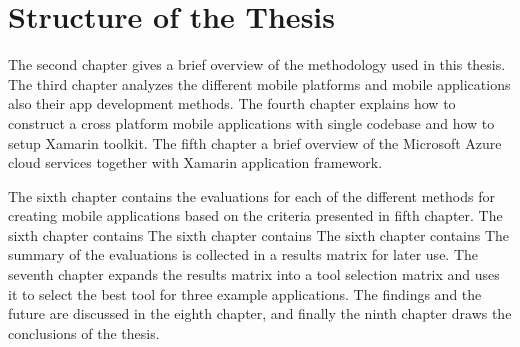 
\section{Structure of the Thesis}

The second chapter gives a brief overview of the methodology used in this thesis.
The third chapter analyzes the different mobile platforms and mobile applications also their app development methods.
The fourth chapter explains how to construct a cross platform mobile applications with single codebase and how to setup Xamarin toolkit.
The fifth chapter a brief overview of the Microsoft Azure cloud services together with Xamarin application framework.

The sixth chapter contains the evaluations for each of the different methods for creating mobile applications based on the criteria presented in fifth chapter.
The sixth chapter contains
The sixth chapter contains
The sixth chapter contains
The summary of the evaluations is collected in a results matrix for later use. The seventh chapter expands the results matrix into a tool selection matrix and uses it to select the best tool for three example applications. The findings and the future are discussed in the eighth chapter, and finally the ninth chapter draws the conclusions of the thesis.
